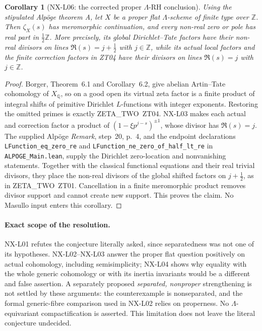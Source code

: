 \documentclass[11pt]{article}
\newtheorem{corollary}[theorem]{Corollary}
\theoremstyle{remark}
\begin{document}
\begin{corollary}[NX-L06: the corrected proper $\Lambda$-RH conclusion]
\label{NX-L06}
Using the stipulated Alp\"oge theorem A, let $X$ be a proper flat
$\Lambda$-scheme of finite type over $\mathbb Z$.  Then $\zeta_X(s)$
has meromorphic continuation, and every non-real zero or pole has
real part in $\tfrac12\mathbb Z$.  More precisely, its global
Dirichlet--Tate factors have their non-real divisors on lines
$\Re(s)=j+\tfrac12$ with $j\in\mathbb Z$, while its actual local
factors and the finite correction factors in ZT04 have their divisors
on lines $\Re(s)=j$ with $j\in\mathbb Z$.
\end{corollary}

\begin{proof}
Borger, Theorem~6.1 and Corollary~6.2, give abelian Artin--Tate
cohomology of $X_{\mathbb Q}$, so on a good open its virtual zeta
factor is a finite product of integral shifts of primitive Dirichlet
$L$-functions with integer exponents.  Restoring the omitted primes
is exactly ZETA\_TWO~ZT04.  NX-L03 makes each actual and correction
factor a product of $(1-\xi p^{j-s})^{\pm1}$, whose divisor has
$\Re(s)=j$.  The supplied Alp\"oge \emph{Remark}, step~20, p.~4,
and the endpoint declarations
\texttt{LFunction\_eq\_zero\_re} and
\texttt{LFunction\_ne\_zero\_of\_half\_lt\_re} in
\texttt{ALPOGE\_Main.lean}, supply the Dirichlet zero-location and
nonvanishing statements.  Together with the classical functional
equations and their real trivial divisors, they place the non-real
divisors of the global shifted factors on $j+\tfrac12$, as in
ZETA\_TWO~ZT01.  Cancellation in a finite meromorphic product removes
divisor support and cannot create new support.  This proves the claim.
No Masullo input enters this corollary.
\end{proof}

\paragraph{Exact scope of the resolution.}
NX-L01 refutes the conjecture literally asked, since separatedness
was not one of its hypotheses.  NX-L02--NX-L03 answer the proper flat
question positively on actual cohomology, including semisimplicity;
NX-L04 shows why equality with the whole generic cohomology or with
its inertia invariants would be a different and false assertion.
A separately proposed \emph{separated, nonproper} strengthening is
not settled by these arguments: the counterexample is nonseparated,
and the formal generic-fibre comparison used in NX-L02 relies on
properness.  No $\Lambda$-equivariant compactification is asserted.
This limitation does not leave the literal conjecture undecided.
\end{document}
